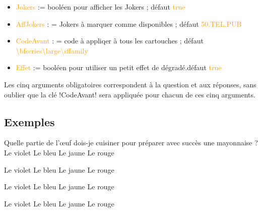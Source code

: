 \documentclass[french,a4paper,11pt]{article}
\newcommand\Cle[1]{{\small\sffamily\textlangle \textcolor{orange}{#1}\textrangle}}
\begin{document}
\begin{tipblock}
\begin{itemize}
	\item \Cle{Jokers} := booléen pour afficher les Jokers ; \hfill{}défaut \Cle{true}
	\item \Cle{AffJokers} : = Jokers à marquer comme disponibles ; \hfill{}défaut \Cle{50.TEL.PUB}
	\item \Cle{CodeAvant} : = code à appliqer à tous les cartouches ; \hfill{}défaut \Cle{\textbackslash bfseries\textbackslash large\textbackslash sffamily}
	\item \Cle{Effet} := booléen pour utiliser un petit effet de dégradé.\hfill{}défaut \Cle{true}
\end{itemize}
\vspace*{-\baselineskip}\leavevmode
\end{tipblock}

\begin{tipblock}
Les cinq arguments obligatoires correspondent à la question et aux réponses, sans oublier que la clé \motcletex!CodeAvant! sera appliquée pour chacun de ces cinq arguments.
\end{tipblock}

\subsection{Exemples}

\begin{DemoCode}[]
\QuizzMillions
	{Quelle partie de l'\oe{}uf dois-je cuisiner pour préparer avec succès une mayonnaise ?}
	{Le violet} {Le bleu}
	{Le jaune} {Le rouge}
\end{DemoCode}

\begin{DemoCode}[]
	{Le violet} {Le bleu}
	{Le jaune} {Le rouge}
\end{DemoCode}

\begin{DemoCode}[]
	{Le violet} {Le bleu}
	{Le jaune} {Le rouge}
\end{DemoCode}

\begin{DemoCode}[]
	{Le violet} {Le bleu}
	{Le jaune} {Le rouge}
\end{DemoCode}
\end{document}
